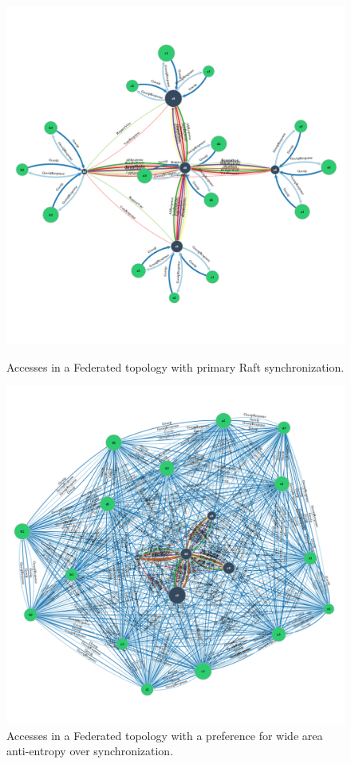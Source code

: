 \documentclass[10pt,conference,compsocconf,letterpaper]{IEEEtran}
\begin{document}
\begin{figure}
    \centering
      \includegraphics[width=\linewidth]{figures/conflict/federated_sync}
      \caption{Accesses in a Federated topology with primary Raft synchronization.}\label{fig:federated_sync}
    \endminipage\hfill
      \includegraphics[width=\linewidth]{figures/conflict/federated_eventual}
      \caption{Accesses in a Federated topology with a preference for wide area anti-entropy over synchronization.}\label{fig:federated_eventual}
    \endminipage\hfill
\end{figure}
\end{document}
